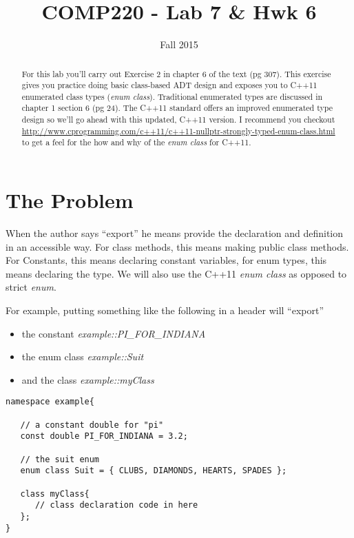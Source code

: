 \documentclass[10pt]{article}
\title{COMP220 - Lab 7 \& Hwk 6}
\author{ }
\date{Fall 2015}
\begin{document}
\maketitle

\begin{abstract}
For this lab you'll carry out Exercise 2 in chapter 6 of the text (pg 307). This exercise gives you practice doing basic class-based ADT design and exposes you to C++11 enumerated class types (\textit{enum class}). Traditional enumerated types are discussed in chapter 1 section 6 (pg 24).  The C++11 standard offers an improved enumerated type design so we'll go ahead with this updated, C++11 version. I recommend you checkout \url{http://www.cprogramming.com/c++11/c++11-nullptr-strongly-typed-enum-class.html} to get a feel for the how and why of the \textit{enum class} for C++11.
\end{abstract}

\section{The Problem}

When the author says ``export'' he means provide the declaration and definition in an accessible way. For class methods, this means making public class methods. For Constants, this means declaring constant variables, for enum types, this means declaring the type. We will also use the C++11 \textit{enum class} as opposed to strict \textit{enum}. 


For example, putting something like the following in a header will ``export'' 
\begin{itemize}
\item the constant \textit{example::PI\_FOR\_INDIANA}
\item the enum class \textit{example::Suit}
\item and the class \textit{example::myClass}
\end{itemize}

\begin{verbatim}
namespace example{

   // a constant double for "pi"
   const double PI_FOR_INDIANA = 3.2;
	
   // the suit enum
   enum class Suit = { CLUBS, DIAMONDS, HEARTS, SPADES };
	
   class myClass{
      // class declaration code in here	
   };
}
\end{verbatim}
\end{document}
